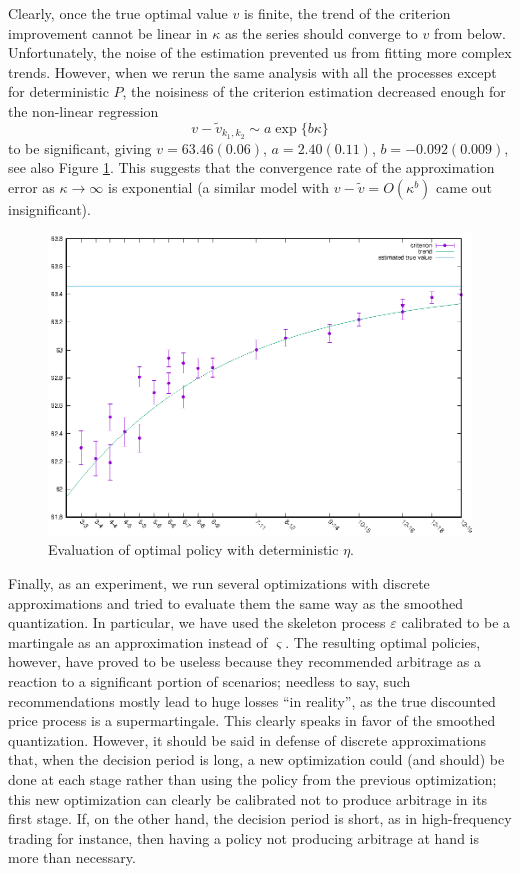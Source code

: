 \documentclass{article}              %
\begin{document}
Clearly, once the true optimal value $v$ is finite, the trend of the criterion improvement
cannot be linear in $\kappa$ as the series should converge
to $v$ from below. Unfortunately, the noise of the estimation
prevented us from fitting more complex trends. However, when we rerun
the same analysis with all the processes except for deterministic $P$, the noisiness of the criterion estimation decreased enough for the non-linear regression
\[
v-\tilde{v}_{k_1,k_2}\sim a\exp\{b\kappa\}
\]
to be significant, giving $v=63.46(0.06)$, $a=2.40(0.11)$, $b=-0.092(0.009)$, see also Figure \ref{fig:mcvs0}. This suggests that the convergence
rate of the approximation error as $\kappa\rightarrow \infty$ is exponential (a similar model with
$v-\tilde{v}=O(\kappa^{b})$ came out insignificant). 

\begin{figure}
\begin{center}
\includegraphics{mcvs0}
\caption{Evaluation of optimal policy with deterministic $\eta$.}
\label{fig:mcvs0}
\end{center}
\end{figure}


Finally, as an experiment, we run several optimizations with discrete
approximations and tried to evaluate them the same way as the smoothed
quantization. In particular, we have used the skeleton process $\varepsilon$
calibrated to be a martingale as an approximation instead of $\varsigma$.
The resulting optimal policies, however, have proved to be useless because they recommended
arbitrage as a reaction to a significant portion of scenarios; needless
to say, such recommendations mostly lead to huge losses ``in reality'', as the true
discounted price process is a supermartingale. This clearly speaks
in favor of the smoothed quantization. However, it should be said in
defense of discrete approximations that, when the decision period
is long, a new optimization could (and should) be done at each stage
rather than using the policy from the previous optimization; this
new optimization can clearly be calibrated not to produce arbitrage in its first stage. If, on the other hand, the decision period is
short, as in high-frequency trading for instance, then
having a policy not producing arbitrage at hand is more than necessary.
\end{document}
